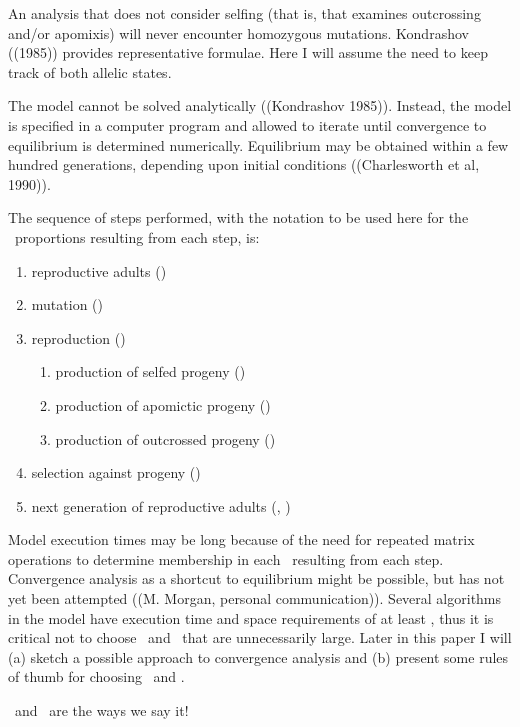 An analysis that does not consider selfing (that is, that examines outcrossing and/or apomixis) will never encounter homozygous mutations.  Kondrashov ((1985)) provides representative formulae.  Here I will assume the need to keep track of both allelic states.

The model cannot be solved analytically ((Kondrashov 1985)).  Instead, the model is specified in a computer program and allowed to iterate until convergence to equilibrium is determined numerically.  Equilibrium may be obtained within a few hundred generations, depending upon initial conditions ((Charlesworth et al, 1990)).

The sequence of steps performed, with the notation to be used here for the \Lijg\ proportions resulting from each step, is:
\begin{enumerate}
	\item reproductive adults (\xijg)
	\item mutation (\xpijg)
	\item reproduction (\xppijg)
	\begin{enumerate}
		\item production of selfed progeny (\xppsijg)
		\item production of apomictic progeny (\xppaijg)
		\item production of outcrossed progeny (\xppoijg)
	\end{enumerate}
	\item selection against progeny (\Xijg)
	\item next generation of reproductive adults (\xijg, \xijgprev)
\end{enumerate}

Model execution times may be long because of the need for repeated matrix operations to determine membership in each \Lgij\ resulting from each step.  Convergence analysis as a shortcut to equilibrium might be possible, but has not yet been attempted ((M. Morgan, personal communication)).  Several algorithms in the model have execution time and space requirements of at least , thus it is critical not to choose \Mi\ and \Mj\ that are unnecessarily large.  Later in this paper I will (a) sketch a possible approach to convergence analysis and (b) present some rules of thumb for choosing \Mj\ and \Mj.

\Lij\ and \Lgij\ are the ways we say it!

